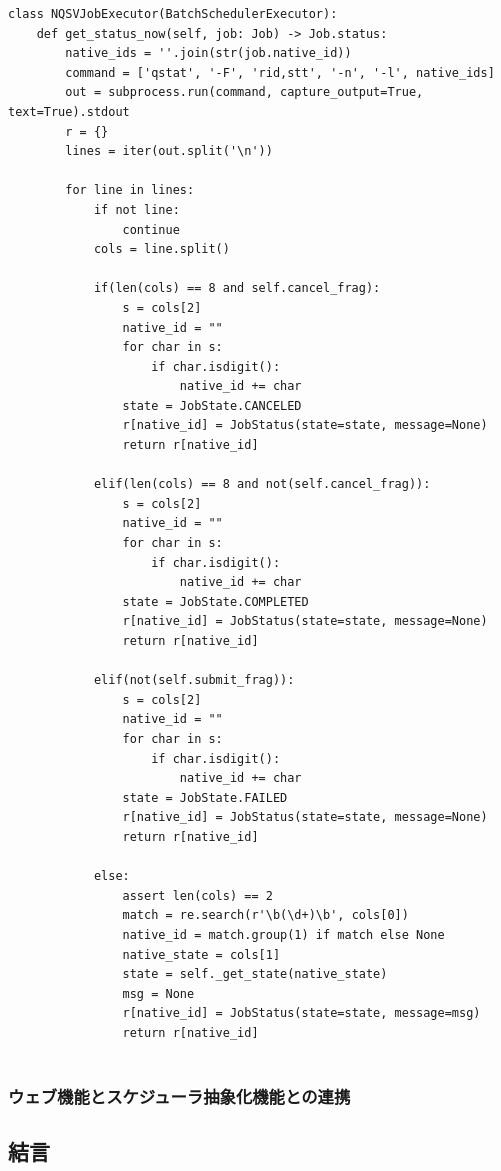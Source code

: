 \begin{lstlisting}[caption=ジョブの状態取得メソッド, label=dockerfile]
class NQSVJobExecutor(BatchSchedulerExecutor):
    def get_status_now(self, job: Job) -> Job.status:
        native_ids = ''.join(str(job.native_id))
        command = ['qstat', '-F', 'rid,stt', '-n', '-l', native_ids]
        out = subprocess.run(command, capture_output=True, text=True).stdout
        r = {}
        lines = iter(out.split('\n'))

        for line in lines:
            if not line:
                continue
            cols = line.split()

            if(len(cols) == 8 and self.cancel_frag):
                s = cols[2]
                native_id = ""
                for char in s:
                    if char.isdigit():
                        native_id += char
                state = JobState.CANCELED
                r[native_id] = JobStatus(state=state, message=None)
                return r[native_id]
            
            elif(len(cols) == 8 and not(self.cancel_frag)):
                s = cols[2]
                native_id = ""
                for char in s:
                    if char.isdigit():
                        native_id += char
                state = JobState.COMPLETED
                r[native_id] = JobStatus(state=state, message=None)
                return r[native_id]

            elif(not(self.submit_frag)):
                s = cols[2]
                native_id = ""
                for char in s:
                    if char.isdigit():
                        native_id += char
                state = JobState.FAILED
                r[native_id] = JobStatus(state=state, message=None)
                return r[native_id]
            
            else:
                assert len(cols) == 2
                match = re.search(r'\b(\d+)\b', cols[0])
                native_id = match.group(1) if match else None
                native_state = cols[1]
                state = self._get_state(native_state)
                msg = None
                r[native_id] = JobStatus(state=state, message=msg)
                return r[native_id]
    
\end{lstlisting}
\label{get_status_now}

\subsubsection{ウェブ機能とスケジューラ抽象化機能との連携}

\subsection{結言}